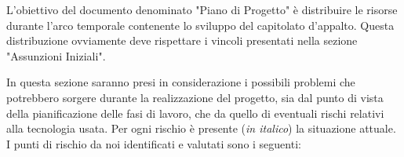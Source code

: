 \newpage
{}
L'obiettivo del documento denominato "Piano di Progetto" \`e distribuire le risorse durante l'arco temporale 
contenente lo sviluppo del capitolato d'appalto. Questa distribuzione ovviamente deve rispettare i vincoli presentati 
nella sezione "Assunzioni Iniziali".

In questa sezione saranno presi in considerazione i possibili problemi che potrebbero sorgere durante la realizzazione del progetto, sia dal punto di vista della pianificazione delle fasi di lavoro, che da quello di eventuali rischi relativi alla tecnologia usata. Per ogni rischio \`e presente (\textit{in italico}) la situazione attuale.\\
I punti di rischio da noi identificati e valutati sono i seguenti:
